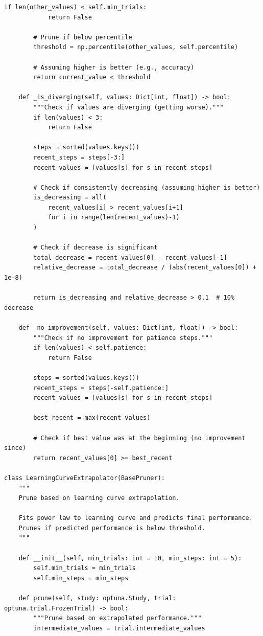 \begin{lstlisting}[style=python, caption=Custom pruning strategies]
        if len(other_values) < self.min_trials:
            return False

        # Prune if below percentile
        threshold = np.percentile(other_values, self.percentile)

        # Assuming higher is better (e.g., accuracy)
        return current_value < threshold

    def _is_diverging(self, values: Dict[int, float]) -> bool:
        """Check if values are diverging (getting worse)."""
        if len(values) < 3:
            return False

        steps = sorted(values.keys())
        recent_steps = steps[-3:]
        recent_values = [values[s] for s in recent_steps]

        # Check if consistently decreasing (assuming higher is better)
        is_decreasing = all(
            recent_values[i] > recent_values[i+1]
            for i in range(len(recent_values)-1)
        )

        # Check if decrease is significant
        total_decrease = recent_values[0] - recent_values[-1]
        relative_decrease = total_decrease / (abs(recent_values[0]) + 1e-8)

        return is_decreasing and relative_decrease > 0.1  # 10% decrease

    def _no_improvement(self, values: Dict[int, float]) -> bool:
        """Check if no improvement for patience steps."""
        if len(values) < self.patience:
            return False

        steps = sorted(values.keys())
        recent_steps = steps[-self.patience:]
        recent_values = [values[s] for s in recent_steps]

        best_recent = max(recent_values)

        # Check if best value was at the beginning (no improvement since)
        return recent_values[0] >= best_recent

class LearningCurveExtrapolator(BasePruner):
    """
    Prune based on learning curve extrapolation.

    Fits power law to learning curve and predicts final performance.
    Prunes if predicted performance is below threshold.
    """

    def __init__(self, min_trials: int = 10, min_steps: int = 5):
        self.min_trials = min_trials
        self.min_steps = min_steps

    def prune(self, study: optuna.Study, trial: optuna.trial.FrozenTrial) -> bool:
        """Prune based on extrapolated performance."""
        intermediate_values = trial.intermediate_values


\end{lstlisting}
